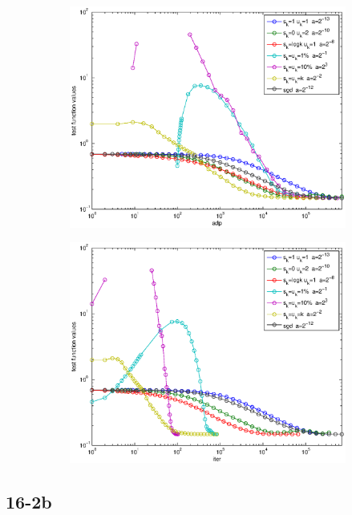 \documentclass[12pt]{article}
\begin{document}
	\begin{figure}[H]
	\begin{subfigure}[b]{.5\linewidth}
		        \includegraphics[width=4in]{GenFigures/16-2-1.eps}
	\end{subfigure}%
	\begin{subfigure}[b]{.5\linewidth}
		        \includegraphics[width=4in]{GenFigures/16-2-2.eps}
	\end{subfigure}%

	\end{figure}
	
	\subsection{16-2b}
\end{document}
